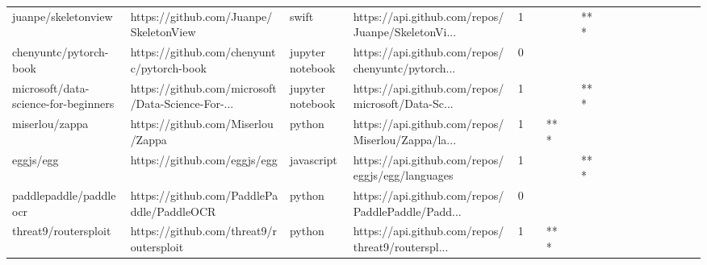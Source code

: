 \begin{tabular}{llllrlllllllllllll}
juanpe/skeletonview                                &             https://github.com/Juanpe/SkeletonView &             swift &  https://api.github.com/repos/Juanpe/SkeletonVi... &       1 &         &        &           &            *** &                 &        &           &           &          &          &       &              &          \\
chenyuntc/pytorch-book                             &          https://github.com/chenyuntc/pytorch-book &  jupyter notebook &  https://api.github.com/repos/chenyuntc/pytorch... &       0 &         &        &           &                &                 &        &           &           &          &          &       &              &          \\
microsoft/data-science-for-beginners               &  https://github.com/microsoft/Data-Science-For-... &  jupyter notebook &  https://api.github.com/repos/microsoft/Data-Sc... &       1 &         &        &           &            *** &                 &        &           &           &          &          &       &              &          \\
miserlou/zappa                                     &                  https://github.com/Miserlou/Zappa &            python &  https://api.github.com/repos/Miserlou/Zappa/la... &       1 &         &    *** &           &                &                 &        &           &           &          &          &       &              &          \\
eggjs/egg                                          &                       https://github.com/eggjs/egg &        javascript &   https://api.github.com/repos/eggjs/egg/languages &       1 &         &        &           &            *** &                 &        &           &           &          &          &       &              &          \\
paddlepaddle/paddleocr                             &          https://github.com/PaddlePaddle/PaddleOCR &            python &  https://api.github.com/repos/PaddlePaddle/Padd... &       0 &         &        &           &                &                 &        &           &           &          &          &       &              &          \\
threat9/routersploit                               &            https://github.com/threat9/routersploit &            python &  https://api.github.com/repos/threat9/routerspl... &       1 &         &    *** &           &                &                 &        &           &           &          &          &       &              &          \\

\end{tabular}
